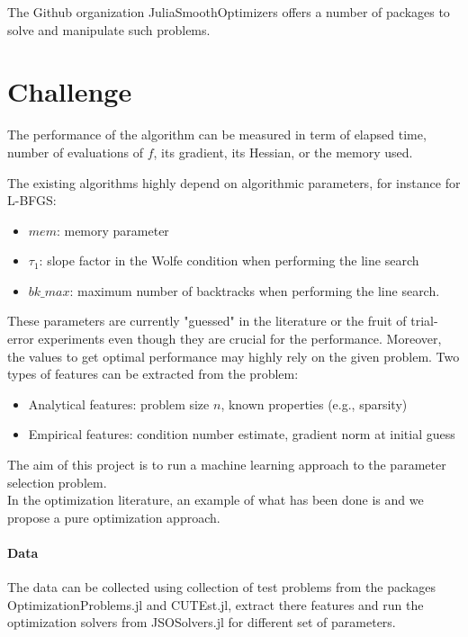 \documentclass{article}
\begin{document}
The Github organization JuliaSmoothOptimizers \cite{The_JuliaSmoothOptimizers_Ecosystem} offers a number of packages to solve and manipulate such problems.

\section{Challenge}

The performance of the algorithm can be measured in term of elapsed time, number of evaluations of $f$, its gradient, its Hessian, or the memory used.

The existing algorithms highly depend on algorithmic parameters, for instance for L-BFGS:
\begin{itemize}
    \item $mem$: memory parameter
    \item $\tau_1$: slope factor in the Wolfe condition when performing the line search
    \item $bk\_{max}$: maximum number of backtracks when performing the line search.
\end{itemize}

These parameters are currently "guessed" in the literature or the fruit of trial-error experiments even though they are crucial for the performance.
Moreover, the values to get optimal performance may highly rely on the given problem. Two types of features can be extracted from the problem:
\begin{itemize}
    \item Analytical features: problem size $n$, known properties (e.g., sparsity)
    \item Empirical features: condition number estimate, gradient norm at initial guess
\end{itemize}

The aim of this project is to run a machine learning approach to the parameter selection problem.\\

{\color{blue}
In the optimization literature, an example of what has been done is \cite{Audet2014} and we propose a pure optimization approach. 
}

\paragraph{Data}

The data can be collected using collection of test problems from the packages OptimizationProblems.jl and CUTEst.jl, extract there features and run the optimization solvers from JSOSolvers.jl for different set of parameters.
\end{document}
